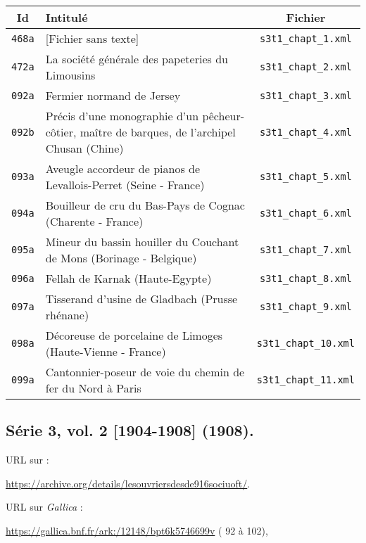 \begin{center}
\begin{longtable}{ | c | p{9.5cm} | c | }
\hline
Id & Intitulé & Fichier \\ \hline
\texttt{468a} & [Fichier sans texte] & \texttt{s3t1\_chapt\_1.xml} \\ \hline
\texttt{472a} & La société générale des papeteries du Limousins & \texttt{s3t1\_chapt\_2.xml} \\ \hline
\texttt{092a} & Fermier normand de Jersey & \texttt{s3t1\_chapt\_3.xml} \\ \hline
\texttt{092b} & Précis d'une monographie d'un pêcheur-côtier, maître de barques, de l'archipel Chusan (Chine) & \texttt{s3t1\_chapt\_4.xml} \\ \hline
\texttt{093a} & Aveugle accordeur de pianos de Levallois-Perret (Seine - France) & \texttt{s3t1\_chapt\_5.xml} \\ \hline
\texttt{094a} & Bouilleur de cru du Bas-Pays de Cognac (Charente - France) & \texttt{s3t1\_chapt\_6.xml} \\ \hline
\texttt{095a} & Mineur du bassin houiller du Couchant de Mons (Borinage - Belgique) & \texttt{s3t1\_chapt\_7.xml} \\ \hline
\texttt{096a} & Fellah de Karnak (Haute-Egypte) & \texttt{s3t1\_chapt\_8.xml} \\ \hline
\texttt{097a} & Tisserand d'usine de Gladbach (Prusse rhénane) & \texttt{s3t1\_chapt\_9.xml} \\ \hline
\texttt{098a} & Décoreuse de porcelaine de Limoges (Haute-Vienne - France) & \texttt{s3t1\_chapt\_10.xml} \\ \hline
\texttt{099a} & Cantonnier-poseur de voie du chemin de fer du Nord à Paris & \texttt{s3t1\_chapt\_11.xml} \\ \hline
\end{longtable}
\end{center}

\subsection{Série 3, vol. 2 [1904-1908] (1908).}
\label{mappings3t2}

URL sur \ia{} : 

\url{https://archive.org/details/lesouvriersdesde916sociuoft/}.

URL sur \textit{Gallica} :

\url{https://gallica.bnf.fr/ark:/12148/bpt6k5746699v} (\no{} 92 à 102),

